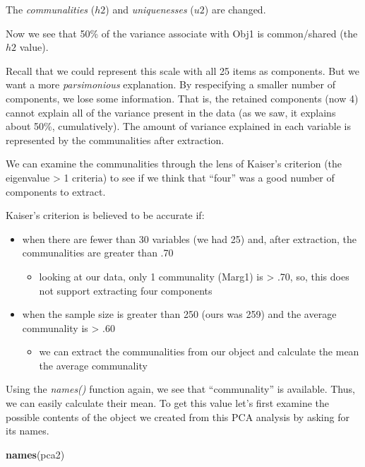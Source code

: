 \documentclass[
  english,
]{book}
\newenvironment{Shaded}{\begin{snugshade}}{\end{snugshade}}
\newcommand{\KeywordTok}[1]{\textcolor[rgb]{0.13,0.29,0.53}{\textbf{#1}}}
\newcommand{\NormalTok}[1]{#1}
\providecommand{\tightlist}{%
  \setlength{\itemsep}{0pt}\setlength{\parskip}{0pt}}
\begin{document}
The \emph{communalities} (\(h2\)) and \emph{uniquenesses} (\(u2\)) are changed.

Now we see that 50\% of the variance associate with Obj1 is common/shared (the \(h2\) value).

Recall that we could represent this scale with all 25 items as components. But we want a more \emph{parsimonious} explanation. By respecifying a smaller number of components, we lose some information. That is, the retained components (now 4) cannot explain all of the variance present in the data (as we saw, it explains about 50\%, cumulatively). The amount of variance explained in each variable is represented by the communalities after extraction.

We can examine the communalities through the lens of Kaiser's criterion (the eigenvalue \textgreater{} 1 criteria) to see if we think that ``four'' was a good number of components to extract.

Kaiser's criterion is believed to be accurate if:

\begin{itemize}
\tightlist
\item
  when there are fewer than 30 variables (we had 25) and, after extraction, the communalities are greater than .70

  \begin{itemize}
  \tightlist
  \item
    looking at our data, only 1 communality (Marg1) is \textgreater{} .70, so, this does not support extracting four components
  \end{itemize}
\item
  when the sample size is greater than 250 (ours was 259) and the average communality is \textgreater{} .60

  \begin{itemize}
  \tightlist
  \item
    we can extract the communalities from our object and calculate the mean the average communality
  \end{itemize}
\end{itemize}

Using the \emph{names()} function again, we see that ``communality'' is available. Thus, we can easily calculate their mean. To get this value let's first examine the possible contents of the object we created from this PCA analysis by asking for its names.

\begin{Shaded}
\begin{Highlighting}[]
\KeywordTok{names}\NormalTok{(pca2)}
\end{Highlighting}
\end{Shaded}
\end{document}
